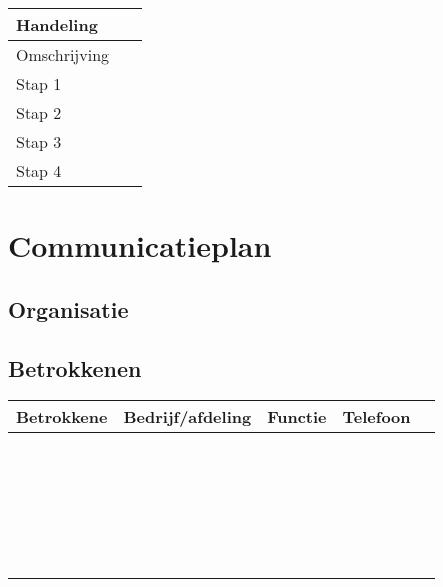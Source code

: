 \documentclass[10pt,a4paper]{report}
\begin{document}
\begin{tabular}{| l | l |}
\hline
\cellcolor[gray]{0.84}Handeling & \ \\
\hline
\cellcolor[gray]{0.84}Omschrijving & \ \\
\hline
\cellcolor[gray]{0.84}Stap 1 & \ \\
\hline
\cellcolor[gray]{0.84}Stap 2 & \ \\
\hline
\cellcolor[gray]{0.84}Stap 3 & \ \\
\hline
\cellcolor[gray]{0.84}Stap 4 & \ \\
\hline
\end{tabular}

\chapter{Communicatieplan}
\section{Organisatie}
\section{Betrokkenen}
\begin{tabular}{| l | l | l | l | l|}
\hline
\rowcolor[gray]{0.84}Betrokkene & Bedrijf/afdeling & Functie & Telefoon\\
\hline
\  & \ & \ & \ \\
\hline
\  & \ & \ & \ \\
\hline
\  & \ & \ & \ \\
\hline
\  & \ & \ & \ \\
\hline
\  & \ & \ & \ \\
\hline
\end{tabular}
\end{document}
